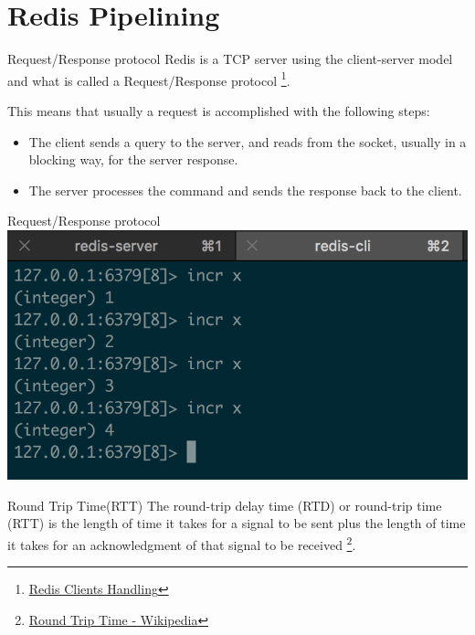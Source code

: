 \documentclass[10pt]{beamer}
\begin{document}
\section{Redis Pipelining}
\begin{frame}[fragile]{Request/Response protocol}
  Redis is a TCP server using the client-server model and what is called
  a Request/Response protocol \footnote{\href{https://redis.io/topics/clients}{
  Redis Clients Handling}}.

  This means that usually a request is accomplished with the following steps:
  \begin{itemize}
    \item The client sends a query to the server, and reads from the socket,
    usually in a blocking way, for the server response.
    \item The server processes the command and sends the response back to
    the client.
  \end{itemize}
\end{frame}

\begin{frame}[fragile]{Request/Response protocol}
  \includegraphics[scale=0.5]{img/pipe-incr}
\end{frame}

\begin{frame}[fragile]{Round Trip Time(RTT)}
  The round-trip delay time (RTD) or round-trip time (RTT) is the length of
  time it takes for a signal to be sent plus the length of time it takes for an
  acknowledgment of that signal to be received
  \footnote{\href{https://en.0wikipedia.org/index.php?q=aHR0cHM6Ly9lbi53aWtpcGVkaWEub3JnL3dpa2kvUm91bmQtdHJpcF9kZWxheV90aW1l}{Round Trip Time - Wikipedia}}.
\end{frame}
\end{document}
